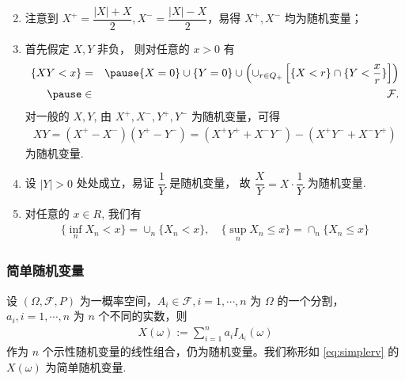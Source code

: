 \begin{frame}
	\vspace{0.6cm}
	\begin{enumerate}[<+-|alert@+>]
		\setcounter{enumi}{1}
		\item 注意到 $X^+=\dfrac{|X|+X}{2}, X^-=\dfrac{|X|-X}{2}$，易得 $X^+,X^-$ 均为随机变量；
		\item 首先假定 $X,Y$ 非负， 则对任意的 $x>0$ 有
		      \begin{eqnarray*}
			      \{XY<x\}&=&\pause \{X=0\}\cup \{Y=0\}\cup \left(\cup_{r\in Q_+}\left[\{X<r\}\cap \{Y<\frac{x}{r}\}\right]\right)\\ \pause
			      &\in&\mathcal{F}.
		      \end{eqnarray*}
		      \pause
		      对一般的 $X,Y$, 由 $X^+,X^-,Y^+,Y^-$ 为随机变量，可得
		      \begin{eqnarray*}
			      XY=(X^+-X^-)(Y^+-Y^-)=(X^+Y^++X^-Y^-)-(X^+Y^-+X^-Y^+)
		      \end{eqnarray*}
		      为随机变量.
		\item 设 $|Y|>0$ 处处成立，易证 $\dfrac{1}{Y}$ 是随机变量， 故 $\dfrac{X}{Y}=X\cdot \dfrac{1}{Y}$ 为随机变量.
		\item 对任意的 $x\in R$, 我们有
		      \begin{eqnarray*}
			      \{\inf_nX_n<x\}=\cup_n\{X_n<x\}, \quad \{\sup_nX_n\le x\}=\cap_n\{X_n\le x\}
		      \end{eqnarray*}

	\end{enumerate}


\end{frame}

\begin{frame}
	\frametitle{简单随机变量}
	\begin{exam}
		设 $(\Omega,\mathcal{F},P)$ 为一概率空间，$A_i\in\mathcal{F}, i=1,\cdots,n$ 为 $\Omega$ 的一个分割，$a_i,i=1,\cdots, n$ 为 $n$ 个不同的实数，则
		\begin{eqnarray}\label{eq:simplerv}
			X(\omega):=\sum_{i=1}^na_iI_{A_i}(\omega)
		\end{eqnarray}
		作为 $n$ 个示性随机变量的线性组合，仍为随机变量。我们称形如 \eqref{eq:simplerv} 的 $X (\omega)$ 为简单随机变量.
	\end{exam}

\end{frame}

